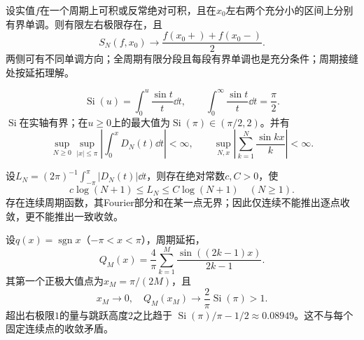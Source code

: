 \begin{result}[局部单调收敛定理]\label{st:jordan}
设实值$f$在一个周期上可积或反常绝对可积，且在$x_0$左右两个充分小的区间上分别有界单调。则有限左右极限存在，且
\[
 S_N(f,x_0)\longrightarrow\frac{f(x_0+)+f(x_0-)}2.
\]
两侧可有不同单调方向；全周期有限分段且每段有界单调也是充分条件；周期接缝处按延拓理解。
\end{result}
\begin{result}[正弦积分与核积分的一致界]\label{st:Si}
\[
 \operatorname{Si}(u)=\int_0^u\frac{\sin t}{t}\dd t,
 \qquad\int_0^\infty\frac{\sin t}{t}\dd t=\frac\pi2.
\]
$\operatorname{Si}$在实轴有界；在$u\ge0$上的最大值为$\operatorname{Si}(\pi)\in(\pi/2,2)$。并有
\[
 \sup_{N\ge0}\sup_{|x|\le\pi}\left|\int_0^xD_N(t)\dd t\right|<\infty,
 \qquad \sup_{N,x}\left|\sum_{k=1}^N\frac{\sin kx}{k}\right|<\infty.
\]
\end{result}
\begin{result}[Lebesgue数与一般一致收敛的限制]\label{st:Lebesgue}
设$L_N=(2\pi)^{-1}\int_{-\pi}^{\pi}|D_N(t)|\dd t$，则存在绝对常数$c,C>0$，使
\[
 c\log(N+1)\le L_N\le C\log(N+1)\quad(N\ge1).
\]
存在连续周期函数，其Fourier部分和在某一点无界；因此仅连续不能推出逐点收敛，更不能推出一致收敛。
\end{result}
\begin{result}[Gibbs现象的标准方波例子]\label{st:Gibbs}
设$q(x)=\operatorname{sgn}x$（$-\pi<x<\pi$），周期延拓，
\[
 Q_M(x)=\frac4\pi\sum_{k=1}^M\frac{\sin((2k-1)x)}{2k-1}.
\]
其第一个正极大值点为$x_M=\pi/(2M)$，且
\[
 x_M\to0,\quad Q_M(x_M)\to\frac2\pi\operatorname{Si}(\pi)>1.
\]
超出右极限$1$的量与跳跃高度$2$之比趋于
$\operatorname{Si}(\pi)/\pi-1/2\approx0.08949$。这不与每个固定连续点的收敛矛盾。
\end{result}

